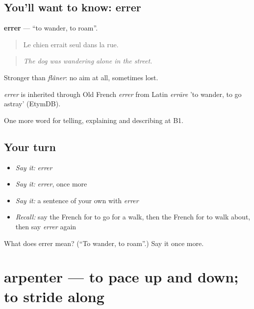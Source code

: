 \subsection*{You'll want to know: errer}
\textbf{errer} — \textquotedblleft{}to wander, to roam\textquotedblright{}.

\begin{quote}
Le chien errait seul dans la rue.
\end{quote}

\begin{quote}
\emph{The dog was wandering alone in the street.}
\end{quote}

Stronger than \emph{flâner}: no aim at all, sometimes lost.

\begin{cousinweb}
\emph{errer} is inherited through Old French \emph{errer} from Latin \emph{errāre} 'to wander, to go astray' (EtymDB).
\end{cousinweb}

\begin{grammarlens}[title={What you've built}]
One more word for telling, explaining and describing at B1.
\end{grammarlens}

\subsection*{Your turn}
\begin{itemize}
\raggedright
  \item \emph{Say it:} \emph{errer}
  \item \emph{Say it:} \emph{errer}, once more
  \item \emph{Say it:} a sentence of your own with \emph{errer}
  \item \emph{Recall:} say the French for to go for a walk, then the French for to walk about, then say \emph{errer} again
\end{itemize}

\begin{tcolorbox}[breakable,colback=teal!4,colframe=teal!35!black,title={Before you move on}]
What does errer mean? (\textquotedblleft{}To wander, to roam\textquotedblright{}.) Say it once more.
\end{tcolorbox}
\section[arpenter]{arpenter — to pace up and down; to stride along}


